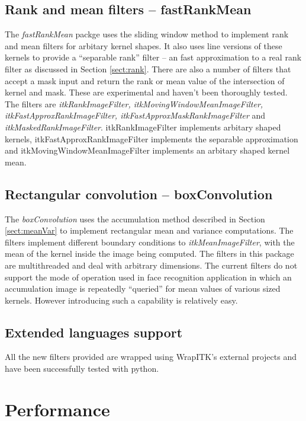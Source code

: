 \documentclass{InsightArticle}
\begin{document}
\subsection{Rank and mean filters -- fastRankMean}
The {\em fastRankMean} packge uses the sliding window method to
implement rank and mean filters for arbitary kernel shapes. It also
uses line versions of these kernels to provide a ``separable rank''
filter -- an fast approximation to a real rank filter as discussed in
Section \ref{sect:rank}. There are also a number of filters that
accept a mask input and return the rank or mean value of the
intersection of kernel and mask. These are experimental and haven't
been thoroughly tested. The filters are {\em itkRankImageFilter,
itkMovingWindowMeanImageFilter, itkFastApproxRankImageFilter,
itkFastApproxMaskRankImageFilter} and {\em
itkMaskedRankImageFilter}. itkRankImageFilter implements arbitary
shaped kernels, itkFastApproxRankImageFilter implements the separable
approximation and itkMovingWindowMeanImageFilter implements an
arbitary shaped kernel mean.

\subsection{Rectangular convolution -- boxConvolution}
The {\em boxConvolution} uses the accumulation method described in
Section \ref{sect:meanVar} to implement rectangular mean and variance
computations. The filters implement different boundary conditions to
{\em itkMeanImageFilter}, with the mean of the kernel inside the image
being computed. The filters in this package are multithreaded and deal
with arbitrary dimensions. The current filters do not support the mode
of operation used in face recognition application in which an
accumulation image is repeatedly ``queried'' for mean values of
various sized kernels. However introducing such a capability is
relatively easy.

\subsection{Extended languages support}

All the new filters provided are wrapped using WrapITK's external projects
\cite{WrapITK} and have been successfully tested with python.

\section{Performance}
\end{document}
